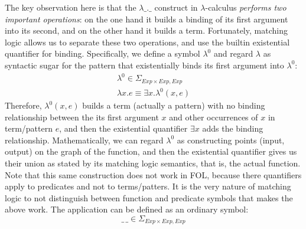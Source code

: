 \documentclass[UTF8,11pt]{article}
\theoremstyle{plain}
\theoremstyle{definition}
\theoremstyle{remark}
\newcommand{\Exp}{\textit{Exp}}
\begin{document}
The key observation here is that the $\lambda\_.\_$ construct in
$\lambda$-calculus \emph{performs two important operations}: on the one hand
it builds a binding of its first argument into its second, and on the other
hand it builds a term.
Fortunately, matching logic allows us to separate these two operations, and
use the builtin existential quantifier for binding.
Specifically, we define a symbol $\lambda^0$ and regard $\lambda$ as syntactic
sugar for the pattern that existentially binds its first argument into $\lambda^0$:
$$
\begin{array}{l}
\lambda^0 \in \Sigma_{\Exp\times\Exp,\Exp} \\
\lambda x . e \equiv \exists x . \lambda^0(x,e)
\end{array}
$$
Therefore, $\lambda^0(x,e)$ builds a term (actually a pattern) with no binding
relationship between the its first argument $x$ and other occurrences of $x$ in
term/pattern $e$, and then the existential quantifier $\exists x$ adds the binding
relationship.
Mathematically, we can regard $\lambda^0$ as constructing points (input, output)
on the graph of the function, and then the existential quantifier gives us their
union as stated by its matching logic semantics, that is, the actual function.
Note that this same construction does not work in FOL, because there quantifiers
apply to predicates and not to terms/patters.
It is the very nature of matching logic to not distinguish between function
and predicate symbols that makes the above work.
The application can be defined as an ordinary symbol:
$$
\_\,\_ \in \Sigma_{\Exp \times \Exp,\Exp}
$$
\end{document}
